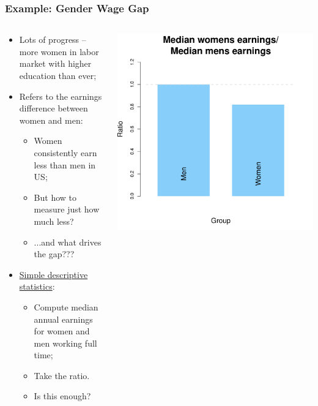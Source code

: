\documentclass[aspectratio=169]{beamer}
\theoremstyle{principle}
\begin{document}
\begin{frame}
\frametitle{Example: Gender Wage Gap}

\begin{columns}
\begin{column}{0.5\textwidth}

\begin{itemize}
\item Lots of progress -- more women in labor market with higher education than ever;
\bigskip
\item Refers to the earnings difference between women and men:
\begin{itemize}
\item Women consistently earn less than men in US;
\item But how to measure just how much less?
\item ...and what drives the gap???
\end{itemize}
\bigskip
\item \href{https://www.americanprogress.org/article/quick-facts-gender-wage-gap/}{Simple descriptive statistics}:
\begin{itemize}
\item Compute median annual earnings for women and men working full time;
\item Take the ratio.
\item Is this enough?
\end{itemize}
\end{itemize}

\end{column}
\begin{column}{0.5\textwidth}
\includegraphics[scale=0.4]{gender_wage_gap.pdf}
\end{column}
\end{columns}

\end{frame}
\end{document}
